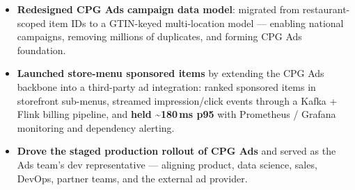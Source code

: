 \documentclass{resume-v2}
\begin{document}
\begin{itemize}
  \item \textbf{Redesigned CPG Ads campaign data model}: migrated from restaurant-scoped item IDs to a GTIN-keyed multi-location model --- enabling national campaigns, removing millions of duplicates, and forming CPG Ads foundation.
  \item \textbf{Launched store-menu sponsored items} by extending the CPG Ads backbone into a third-party ad integration: ranked sponsored items in storefront sub-menus, streamed impression/click events through a Kafka + Flink billing pipeline, and \textbf{held \textasciitilde180\,ms p95} with Prometheus / Grafana monitoring and dependency alerting.
  \item \textbf{Drove the staged production rollout of CPG Ads} and served as the Ads team's dev representative --- aligning product, data science, sales, DevOps, partner teams, and the external ad provider.
\end{itemize}
\end{document}

